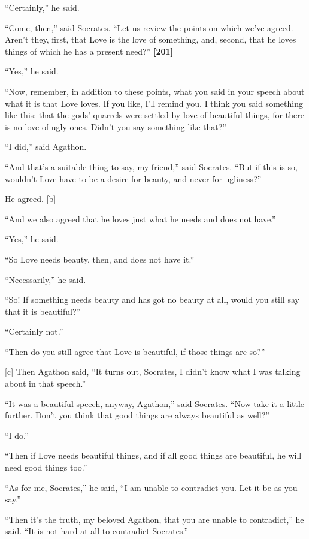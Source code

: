 “Certainly,” he said.

“Come, then,” said Socrates. “Let us review the points on which we've
agreed. Aren't they, first, that Love is the love of something, and,
second, that he loves things of which he has a present need?”
{\bf {[}201{]}}

“Yes,” he said.

“Now, remember, in addition to these points, what you said in your
speech about what it is that Love loves. If you like, I'll remind you. I
think you said something like this: that the gods' quarrels were settled
by love of beautiful things, for there is no love of ugly
ones. Didn't you say
something like that?”

“I did,” said Agathon.

“And that's a suitable thing to say, my friend,” said Socrates. “But if
this is so, wouldn't Love have to be a desire for beauty, and never for
ugliness?”

He agreed. {[}b{]}

“And we also agreed that he loves just what he needs and does not have.”

“Yes,” he said.

“So Love needs beauty, then, and does not have it.”

“Necessarily,” he said.

“So! If something needs beauty and has got no beauty at all, would you
still say that it is beautiful?”

“Certainly not.”

“Then do you still agree that Love is beautiful, if those things are
so?”

{[}c{]} Then Agathon said, “It turns out, Socrates, I didn't know what I
was talking about in that speech.”

“It was a beautiful speech, anyway, Agathon,” said Socrates. “Now take
it a little further. Don't you think that good things are always
beautiful as well?”

“I do.”

“Then if Love needs beautiful things, and if all good things are
beautiful, he will need good things too.”

“As for me, Socrates,” he said, “I am unable to contradict you. Let it
be as you say.”

“Then it's the truth, my beloved Agathon, that you are unable to
contradict,” he said. “It is not hard at all to contradict
Socrates.”\crlf
\crlf

